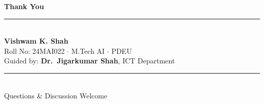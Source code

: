 \documentclass[10pt,aspectratio=43]{beamer}
\begin{document}
{
\begin{frame}[plain]
  \begin{center}
    \vspace{1.0cm}
    {\color{primary}\Large\textbf{Thank You}}\\[0.3cm]
    {\color{secondary}\rule{0.5\textwidth}{0.8pt}}\\[0.4cm]
    {\normalsize\color{primary}\textbf{Vishwam K. Shah}}\\[0.1cm]
    {\small\color{primary!70}Roll No: 24MAI022 $\cdot$ M.Tech AI $\cdot$ PDEU}\\[0.15cm]
    {\small\color{primary!70}Guided by: \textbf{Dr.\ Jigarkumar Shah}, ICT Department}\\[0.5cm]
    {\color{secondary}\rule{0.5\textwidth}{0.4pt}}\\[0.35cm]
    {\normalsize\color{primary!80} Questions \& Discussion Welcome}
  \end{center}
\end{frame}
}
\end{document}
